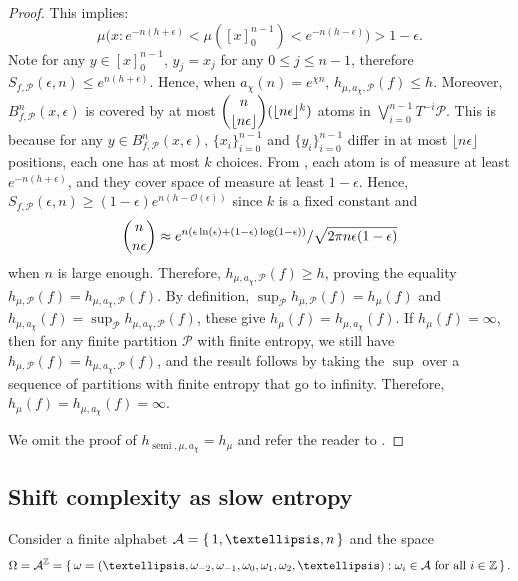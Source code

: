 \documentclass[oneside]{amsart}
\theoremstyle{plain}
\theoremstyle{definition}
\newcommand{\<}{\langle}
\renewcommand{\>}{\rangle}
\renewcommand{\P}{\mathcal{P}}
\newcommand{\Z}{\mathbb{Z}}
\newcommand{\e}{\epsilon}
\renewcommand{\|}{|\!|} %
\newcommand{\semitop}{\operatorname{semi}} %
\begin{document}
\begin{proof}
This implies: 
\begin{equation}
\label{equation exp}
    \mu\Big(x:e^{-n(h+\epsilon)}<\mu([x]_0^{n-1})<e^{-n(h-\epsilon)}\Big)>1-\epsilon.
\end{equation}
Note for any $y\in [x]_0^{n-1}$, 
$y_j=x_j$ for any $0\leq j \leq n-1$,
therefore $S_{f,\P}(\e,n)\leq e^{n(h+\epsilon)}$.
Hence, when $a_{\chi}(n)=e^{\chi n}$, 
$h_{\mu,a_{\chi},\P}(f)\leq 
h$. Moreover, $B_{f,\P}^{n} (x,\e)$
is covered by at most $\dbinom{n}{\lfloor n\e \rfloor}(\lfloor n\epsilon\rfloor^k)$ 
atoms in $\displaystyle\bigvee_{i=0}^{n-1}T^{-i}\P$. 
This is because for any $y\in  B^{n}_{f,\P}(x,\e)$, $\{x_i\}_{i=0}^{n-1}$ and $\{y_i\}_{i=0}^{n-1}$ differ in at most $\lfloor n\epsilon\rfloor$ positions, each one
has at most $k$ choices. From , each atom is of measure at least $e^{-n(h+\e)}$, and they cover space of measure at least $1-\e$.
Hence, 
$S_{f,\P}(\e,n)\geq (1-\epsilon)e^{n(h-\mathcal{O}(\epsilon))}$ since $k$ is a fixed constant  
and 
\begin{equation*}
    \dbinom{n}{n\epsilon}\approx e^{n(\epsilon\ln(\epsilon)+(1-\epsilon)\log(1-\epsilon))}/\sqrt{2\pi n \e (1-\epsilon)}
\end{equation*}
when $n$ is large enough. Therefore, $h_{\mu,a_{\chi},\P}(f)\geq h$, proving the equality $h_{\mu,\P}(f) = h_{\mu,a_{\chi},\P}(f)$. By definition, $\displaystyle\sup_{\P}h_{\mu,\P}(f)=h_{\mu}(f)$ and $\displaystyle h_{\mu,a_\chi}(f) = \sup_{\P}h_{\mu,a_\chi,\P}(f)$, these give $h_{\mu}(f)=h_{\mu,a_\chi}(f)$.
If $h_\mu(f)=\infty$, then for any finite partition $\P$ with finite entropy, we still have $h_{\mu,\P}(f)=h_{\mu,a_{\chi},\P}(f)$, and the result follows by taking the $\sup$ over a sequence of partitions with finite entropy that go to infinity. Therefore, 
$h_{\mu}(f)=h_{\mu,a_\chi}(f)=\infty$.


We omit the proof of $h_{\semitop,\mu,a_\chi} = h_\mu$ and refer the reader to \cite[Theorem (I.I)]{KatokLyapunov}.
\end{proof}


\subsection{Shift complexity as slow entropy}
\label{sec:complexity}
Consider a finite alphabet $\mathcal A = \set{1,\dots,n}$ and the space 
\begin{equation*}
    \Omega = \mathcal A^\Z = \set{\omega = (\dots,\omega_{-2},\omega_{-1},\omega_0,\omega_1,\omega_2,\dots) : \omega_i \in \mathcal A \mbox{ for all }i \in \Z}.
\end{equation*}
\end{document}
